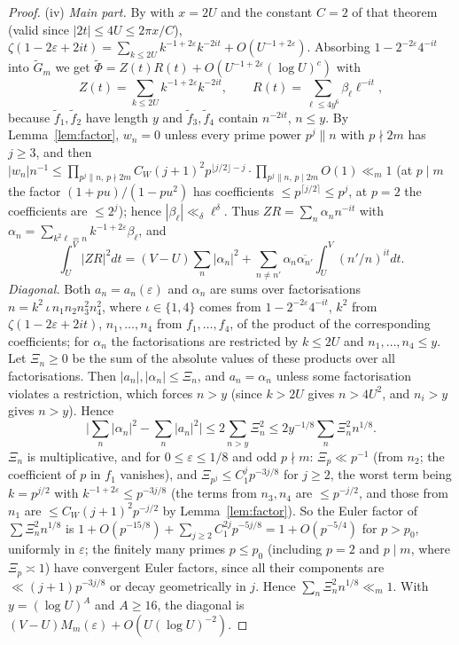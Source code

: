 \documentclass[11pt]{amsart}
\theoremstyle{remark}
\begin{document}
\begin{proof}
(iv) \emph{Main part.} By \cite[Thm.~4.11]{T} with $x=2U$ and the constant $C=2$ of that theorem (valid since $|2t|\le4U\le2\pi x/C$), $\zeta(1-2\varepsilon+2it)=\sum_{k\le2U}k^{-1+2\varepsilon}k^{-2it}+O(U^{-1+2\varepsilon})$. Absorbing $1-2^{-2\varepsilon}4^{-it}$ into $\widetilde G_m$ we get $\widetilde\Phi=Z(t)R(t)+O(U^{-1+2\varepsilon}(\log U)^{c})$ with
\[
Z(t)=\sum_{k\le2U}k^{-1+2\varepsilon}k^{-2it},\qquad R(t)=\sum_{\ell\le4y^6}\beta_\ell\ell^{-it},
\]
because $\tilde f_1,\tilde f_2$ have length $y$ and $\tilde f_3,\tilde f_4$ contain $n^{-2it}$, $n\le y$. By Lemma~\ref{lem:factor}, $w_n=0$ unless every prime power $p^j\|n$ with $p\nmid2m$ has $j\ge3$, and then $|w_n|n^{-1}\le\prod_{p^j\|n,\,p\nmid2m}C_W(j+1)^2p^{\lfloor j/2\rfloor-j}\cdot\prod_{p^j\|n,\,p\mid2m}O(1)\ll_m1$ (at $p\mid m$ the factor $(1+pu)/(1-pu^2)$ has coefficients $\le p^{\lceil j/2\rceil}\le p^j$, at $p=2$ the coefficients are $\le2^j$); hence $|\beta_\ell|\ll_\delta\ell^{\delta}$. Thus $ZR=\sum_n\alpha_nn^{-it}$ with $\alpha_n=\sum_{k^2\ell=n}k^{-1+2\varepsilon}\beta_\ell$, and
\[
\int_U^V|ZR|^2dt=(V-U)\sum_n|\alpha_n|^2+\sum_{n\neq n'}\alpha_n\overline{\alpha_{n'}}\int_U^V(n'/n)^{it}dt.
\]
\emph{Diagonal.} Both $a_n=a_n(\varepsilon)$ and $\alpha_n$ are sums over factorisations $n=k^2\,\iota\,n_1n_2n_3^2n_4^2$, where $\iota\in\{1,4\}$ comes from $1-2^{-2\varepsilon}4^{-it}$, $k^2$ from $\zeta(1-2\varepsilon+2it)$, $n_1,\dots,n_4$ from $f_1,\dots,f_4$, of the product of the corresponding coefficients; for $\alpha_n$ the factorisations are restricted by $k\le2U$ and $n_1,\dots,n_4\le y$. Let $\Xi_n\ge0$ be the sum of the absolute values of these products over all factorisations. Then $|a_n|,|\alpha_n|\le \Xi_n$, and $a_n=\alpha_n$ unless some factorisation violates a restriction, which forces $n>y$ (since $k>2U$ gives $n>4U^2$, and $n_i>y$ gives $n>y$). Hence
\[
\Big|\sum_n|\alpha_n|^2-\sum_n|a_n|^2\Big|\le2\sum_{n>y}\Xi_n^2\le2y^{-1/8}\sum_n\Xi_n^2n^{1/8}.
\]
$\Xi_n$ is multiplicative, and for $0\le\varepsilon\le1/8$ and odd $p\nmid m$: $\Xi_p\ll p^{-1}$ (from $n_2$; the coefficient of $p$ in $f_1$ vanishes), and $\Xi_{p^j}\le C_1^jp^{-3j/8}$ for $j\ge2$, the worst term being $k=p^{j/2}$ with $k^{-1+2\varepsilon}\le p^{-3j/8}$ (the terms from $n_3,n_4$ are $\le p^{-j/2}$, and those from $n_1$ are $\le C_W(j+1)^2p^{-j/2}$ by Lemma~\ref{lem:factor}). So the Euler factor of $\sum \Xi_n^2n^{1/8}$ is $1+O(p^{-15/8})+\sum_{j\ge2}C_1^{2j}p^{-5j/8}=1+O(p^{-5/4})$ for $p>p_0$, uniformly in $\varepsilon$; the finitely many primes $p\le p_0$ (including $p=2$ and $p\mid m$, where $\Xi_p\asymp1$) have convergent Euler factors, since all their components are $\ll(j+1)p^{-3j/8}$ or decay geometrically in $j$. Hence $\sum_n\Xi_n^2n^{1/8}\ll_m1$. With $y=(\log U)^A$ and $A\ge16$, the diagonal is $(V-U)M_m(\varepsilon)+O(U(\log U)^{-2})$.


\end{proof}
\end{document}

